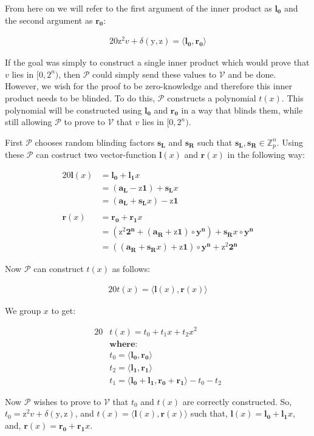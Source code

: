 \documentclass{article}
\newcommand{\eq}[1]{\begin{alignat*}{20}#1\end{alignat*}}
\renewcommand{\vec}[1]{\boldsymbol{#1}}
\newcommand{\ran}[1]{\mathrm{#1}}
\newcommand{\vecran}[1]{\mathbf{#1}}
\newcommand{\V}{\mathcal{V}}
\renewcommand{\P}{\mathcal{P}}
\newcommand{\Z}{\mathbb{Z}}
\newcommand{\dotp}[2]{\langle #1, #2 \rangle}
\newcommand{\opn}[1]{\operatorname{#1}}
\newcommand{\vecl}[1]{\vec{#1_{\opn{L}}}}
\newcommand{\vecr}[1]{\vec{#1_{\opn{R}}}}
\begin{document}
From here on we will refer to the first argument of the inner product as $\vec{l_0}$ and the second argument as $\vec{r_0}$:

\eq{
	\ran{z^2}v + \delta(\ran{y},\ran{z}) = \dotp{\vec{l_0}}{\vec{r_0}}
}

If the goal was simply to construct a single inner product which
would prove that $v$ lies in $[0,2^n)$, then $\P$ could simply send
these values to $\V$ and be done. However, we wish for the proof to be
zero-knowledge and therefore this inner product needs to be blinded. To
do this, $\P$ constructs a polynomial $t(x)$. This polynomial will
be constructed using $\vec{l_0}$ and $\vec{r_0}$ in a way that blinds
them, while still allowing $\P$ to prove to $\V$ that $v$ lies in
$[0,2^n)$.

First $\P$ chooses random blinding factors $\vecran{s_L}$ and
$\vecran{s_R}$ such that $\vecl{s},\vecr{s}\in \Z^n_p$. Using these
$\P$ can costruct two vector-function $\vec{l}(x)$ and $\vec{r}(x)$
in the following way:

\eq{
	\vec{l}(x) &= \vec{l_0} + \vec{l_1}x \\ &= (\vecl{a} - \ran{z}\vec{1}) + \vecl{s}x \\ &= (\vecl{a} + \vecl{s}x) - \ran{z}\vec{1}\\&\\
	\vec{r}(x) &= \vec{r_0} + \vec{r_1}x \\ &= (\ran{z^2}\vec{2^n} + (\vecr{a} + \ran{z}\vec{1})\circ\vecran{y^n}) + \vecr{s}x\circ\vecran{y^n} \\ &= ((\vecr{a} + \vecr{s}x) + \ran{z}\vec{1}) \circ \vecran{y^n} + \ran{z}^2\vec{2^n}
}

Now $\P$ can construct $t(x)$ as follows:

\eq{
	t(x) = \dotp{\vec{l}(x)}{\vec{r}(x)}
}

We group $x$ to get:

\eq{
	&t(x) = t_0 + t_1x + t_2x^2 \\
	&\textbf{where:} \\
	&t_0 = \dotp{\vec{l_0}}{\vec{r_0}}\\
	&t_2 = \dotp{\vec{l_1}}{\vec{r_1}}\\
	&t_1 = \dotp{\vec{l_0}+\vec{l_1}}{\vec{r_0} + \vec{r_1}} - t_0 - t_2
}

Now $\P$ wishes to prove to $\V$ that $t_0$ and $t(x)$ are correctly
constructed. So, $t_0 = \ran{z^2}v + \delta(\ran{y},\ran{z})$, and $t(x)
= \dotp{\vec{l}(x)}{\vec{r}(x)}$ such that, $\vec{l}(x) = \vec{l_0}
+ \vec{l_1}x$, and, $\vec{r}(x) = \vec{r_0} + \vec{r_1}x$.
\end{document}
